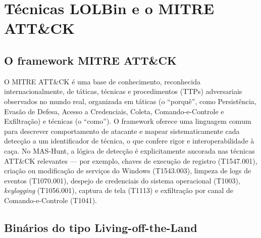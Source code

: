\section{Técnicas LOLBin e o MITRE ATT\&CK}
\label{sec:lolbinattack}

\subsection{O framework MITRE ATT\&CK}
\label{subsec:attack}

O MITRE ATT\&CK é uma base de conhecimento, reconhecida internacionalmente, de táticas, técnicas e procedimentos (TTPs) adversariais observados no mundo real, organizada em táticas (o ``porquê'', como Persistência, Evasão de Defesa, Acesso a Credenciais, Coleta, Comando-e-Controle e Exfiltração) e técnicas (o ``como''). O framework oferece uma linguagem comum para descrever comportamento de atacante e mapear sistematicamente cada detecção a um identificador de técnica, o que confere rigor e interoperabilidade à caça. No MAS-Hunt, a lógica de detecção é explicitamente ancorada nas técnicas ATT\&CK relevantes — por exemplo, chaves de execução de registro (T1547.001), criação ou modificação de serviços do Windows (T1543.003), limpeza de logs de eventos (T1070.001), despejo de credenciais do sistema operacional (T1003), \textit{keylogging} (T1056.001), captura de tela (T1113) e exfiltração por canal de Comando-e-Controle (T1041).

\subsection{Binários do tipo Living-off-the-Land}
\label{subsec:lolbin}

